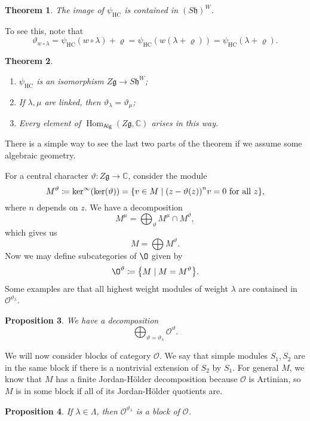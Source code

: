 \documentclass[leqno, openany]{memoir}
\newtheorem{thm}{Theorem}[section]
\newtheorem{prop}[thm]{Proposition}
\theoremstyle{definition}
\theoremstyle{remark}
\theoremstyle{plain}
\theoremstyle{definition}
\theoremstyle{remark}
\newcommand{\C}{\mathbb{C}}
\newcommand{\g}{\mathfrak{g}}
\newcommand{\h}{\mathfrak{h}}
\newcommand{\mc}[1]{\mathcal{#1}}
\newcommand{\mr}[1]{\mathrm{#1}}
\newcommand{\ms}[1]{\mathsf{#1}}
\DeclareMathOperator{\Hom}{Hom}
\begin{document}
\begin{thm}
    The image of $\psi_{\mr{HC}}$ is contained in ${(S \h)}^W$.
\end{thm}

To see this, note that
\[ \vartheta_{w \circ \lambda} = \psi_{\mr{HC}}(w \circ \lambda) + \varrho = \psi_{\mr{HC}}(w(\lambda + \varrho)) = \psi_{\mr{HC}}(\lambda + \varrho). \]

\begin{thm}\leavevmode
    \begin{enumerate}
        \item $\psi_{\mr{HC}}$ is an isomorphism $Z \g \to S \h^W$;
        \item If $\lambda, \mu$ are linked, then $\vartheta_{\lambda} = \vartheta_{\mu}$;
        \item Every element of $\Hom_{\ms{Alg}}(Z \g, \C)$ arises in this way.
    \end{enumerate}
\end{thm}
There is a simple way to see the last two parts of the theorem if we assume some algebraic geometry.

For a central character $\vartheta \colon Z\g \to \C$, consider the module
\[ M^{\vartheta} \coloneqq \ker^{\infty}(\ker(\vartheta)) = \qty{ v \in M \mid {(z - \vartheta(z))}^n v = 0 \text{ for all } z}, \]
where $n$ depends on $z$. We have a decomposition
\[ M^{\mu} = \bigoplus_{\vartheta} M^{\mu} \cap M^{\vartheta}, \]
which gives us
\[ M = \bigoplus M^{\vartheta}. \]
Now we may define subcategories of $\O$ given by
\[ \O^{\vartheta} \coloneqq \qty{M \mid M = M^{\vartheta}}. \]
Some examples are that all highest weight modules of weight $\lambda$ are contained in $\mc{O}^{\vartheta_{\lambda}}$.

\begin{prop}
    We have a decomposition
    \[ \bigoplus_{\vartheta = \vartheta_{\lambda}} \mc{O}^{\vartheta}. \]
\end{prop}

We will now consider blocks of category $\mc{O}$. We say that simple modules $S_1, S_2$ are in the same block if there is a nontrivial extension of $S_2$ by $S_1$. For general $M$, we know that $M$ has a finite Jordan-H\"older decomposition because $\mc{O}$ is Artinian, so $M$ is in some block if all of its Jordan-H\"older quotients are.

\begin{prop}
    If $\lambda \in \Lambda$, then $\mc{O}^{\vartheta_{\lambda}}$ is a block of $\mc{O}$.
\end{prop}
\end{document}
